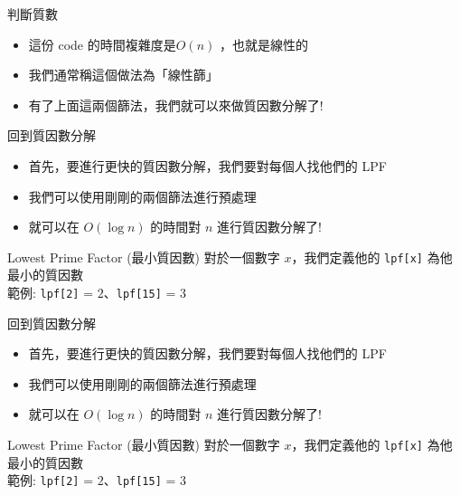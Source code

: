 \documentclass[aspectratio=169]{beamer}
\begin{document}
\begin{frame}[fragile]{判斷質數}
    \begin{itemize}
        \item<1-> 這份 code 的時間複雜度是$O(n)$ ，也就是線性的
        \item<2-> 我們通常稱這個做法為「線性篩」
        \item<3-> 有了上面這兩個篩法，我們就可以來做質因數分解了!
    \end{itemize}
\end{frame}

\begin{frame}{回到質因數分解}
    \begin{itemize}
        \item<1-> 首先，要進行更快的質因數分解，我們要對每個人找他們的 LPF
        \item<2-> 我們可以使用剛剛的兩個篩法進行預處理
        \item<2-> 就可以在 $O(\log n)$ 的時間對 $n$ 進行質因數分解了!
    \end{itemize}
    \begin{alertblock}{Lowest Prime Factor (最小質因數)}
        對於一個數字 $x$，我們定義他的 \texttt{lpf[x]} 為他最小的質因數 \\
        \vspace{5mm}
        範例: \texttt{lpf[2]} = $2$、\texttt{lpf[15]} = $3$
    \end{alertblock}
\end{frame}

\begin{frame}{回到質因數分解}
    \begin{itemize}
        \item<1-> 首先，要進行更快的質因數分解，我們要對每個人找他們的 LPF
        \item<2-> 我們可以使用剛剛的兩個篩法進行預處理
        \item<2-> 就可以在 $O(\log n)$ 的時間對 $n$ 進行質因數分解了!
    \end{itemize}
    \begin{alertblock}{Lowest Prime Factor (最小質因數)}
        對於一個數字 $x$，我們定義他的 \texttt{lpf[x]} 為他最小的質因數 \\
        \vspace{5mm}
        範例: \texttt{lpf[2]} = $2$、\texttt{lpf[15]} = $3$
    \end{alertblock}
\end{frame}
\end{document}

